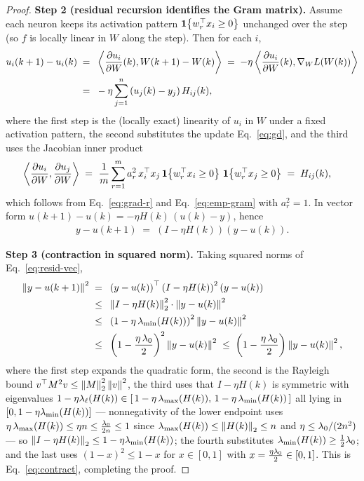 \begin{proof}
\smallskip\noindent\textbf{Step 2 (residual recursion identifies the Gram matrix).}
Assume each neuron keeps its activation pattern $\mathbf{1}\!\left\{w_r^{\top} x_i \ge 0\right\}$ unchanged over
the step (so $f$ is locally linear in $W$ along the step). Then for each $i$,
\begin{align}\label{eq:u-step}
u_i(k+1) - u_i(k)
\;=\; & ~ \left\langle  \frac{\partial u_i}{\partial W}(k) ,  W(k+1) - W(k)  \right\rangle
\;=\; -\eta \left\langle  \frac{\partial u_i}{\partial W}(k) ,  \nabla_W L(W(k))  \right\rangle \\
\;=\; & ~ -\eta \sum_{j=1}^{n} \left( u_j(k) - y_j \right) H_{ij}(k),
\end{align}
where the first step is the (locally exact) linearity of $u_i$ in $W$ under a fixed activation
pattern, the second substitutes the update Eq.~\eqref{eq:gd}, and the third uses the
Jacobian inner product
\begin{align}\label{eq:gram-identity}
\left\langle  \frac{\partial u_i}{\partial W} ,  \frac{\partial u_j}{\partial W}  \right\rangle
\;=\; & ~ \frac{1}{m}\sum_{r=1}^{m} a_r^2\, x_i^{\top} x_j\,
\mathbf{1}\!\left\{w_r^{\top}x_i\ge0\right\}\,\mathbf{1}\!\left\{w_r^{\top}x_j\ge0\right\}
\;=\; H_{ij}(k),
\end{align}
which follows from Eq.~\eqref{eq:grad-r} and Eq.~\eqref{eq:emp-gram} with $a_r^2 = 1$. In
vector form $u(k+1) - u(k) = -\eta H(k)\,(u(k) - y)$, hence
\begin{align}\label{eq:resid-vec}
y - u(k+1) \;=\; \left( I - \eta H(k) \right) \left( y - u(k) \right).
\end{align}

\smallskip\noindent\textbf{Step 3 (contraction in squared norm).}
Taking squared norms of Eq.~\eqref{eq:resid-vec},
\begin{align}\label{eq:contract-chain}
\left\|  y - u(k+1)  \right\|^2
\;=\; & ~ \left( y - u(k) \right)^{\top} \left( I - \eta H(k) \right)^2 \left( y - u(k) \right) \\
\;\le\; & ~ \left\|  I - \eta H(k)  \right\|_2^2 \cdot \left\|  y - u(k)  \right\|^2 \\
\;\le\; & ~ \left( 1 - \eta\,\lambda_{\min}(H(k)) \right)^2 \left\|  y - u(k)  \right\|^2 \\
\;\le\; & ~ \left( 1 - \frac{\eta\,\lambda_{0}}{2} \right)^2 \left\|  y - u(k)  \right\|^2
\;\le\; \left( 1 - \frac{\eta\,\lambda_{0}}{2} \right) \left\|  y - u(k)  \right\|^2,
\end{align}
where the first step expands the quadratic form, the second is the Rayleigh bound
$v^\top M^2 v \le \left\| M \right\|_2^2 \left\| v \right\|^2$, the third uses that $I - \eta H(k)$ is symmetric
with eigenvalues $1 - \eta \lambda_\ell(H(k)) \in [\,1 - \eta\,\lambda_{\max}(H(k)),\,
1 - \eta\,\lambda_{\min}(H(k))\,]$ all lying in $[0, 1 - \eta\lambda_{\min}(H(k))]$ --- nonnegativity of the
lower endpoint uses $\eta\,\lambda_{\max}(H(k)) \le \eta n \le \tfrac{\lambda_{0}}{2n} \le 1$ since
$\lambda_{\max}(H(k)) \le \left\| H(k) \right\|_{2} \le n$ and $\eta \le \lambda_{0}/(2n^2)$ --- so
$\left\| I - \eta H(k) \right\|_2 \le 1 - \eta\lambda_{\min}(H(k))$; the fourth substitutes
$\lambda_{\min}(H(k)) \ge \tfrac12\lambda_{0}$; and the last uses $(1 - x)^2 \le 1 - x$ for $x \in [0,1]$
with $x = \tfrac{\eta\lambda_{0}}{2} \in [0,1]$. This is Eq.~\eqref{eq:contract}, completing the proof.
\end{proof}
